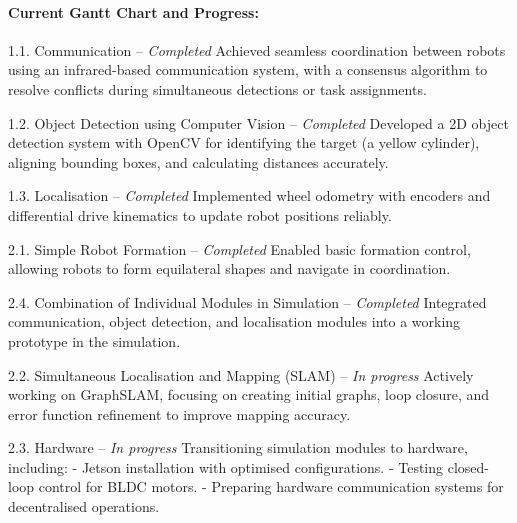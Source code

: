\paragraph*{Current Gantt Chart and Progress:}
\begin{description}
    \item[Phase 1: Simulation and Fundamental Modules]
    
    \item 1.1. Communication -- \textit{Completed}  
    Achieved seamless coordination between robots using an infrared-based communication system, with a consensus algorithm to resolve conflicts during simultaneous detections or task assignments.

    \item 1.2. Object Detection using Computer Vision -- \textit{Completed}  
    Developed a 2D object detection system with OpenCV for identifying the target (a yellow cylinder), aligning bounding boxes, and calculating distances accurately.

    \item 1.3. Localisation -- \textit{Completed}  
    Implemented wheel odometry with encoders and differential drive kinematics to update robot positions reliably.

    \item 2.1. Simple Robot Formation -- \textit{Completed}  
    Enabled basic formation control, allowing robots to form equilateral shapes and navigate in coordination.

    \item 2.4. Combination of Individual Modules in Simulation -- \textit{Completed}  
    Integrated communication, object detection, and localisation modules into a working prototype in the simulation.

    \item 2.2. Simultaneous Localisation and Mapping (SLAM) -- \textit{In progress}  
    Actively working on GraphSLAM, focusing on creating initial graphs, loop closure, and error function refinement to improve mapping accuracy.

    \item[Phase 2: Transition to Hardware and Advanced Features]

    \item 2.3. Hardware -- \textit{In progress}  
    Transitioning simulation modules to hardware, including:
    - Jetson installation with optimised configurations.
    - Testing closed-loop control for BLDC motors.
    - Preparing hardware communication systems for decentralised operations.


\end{description}
